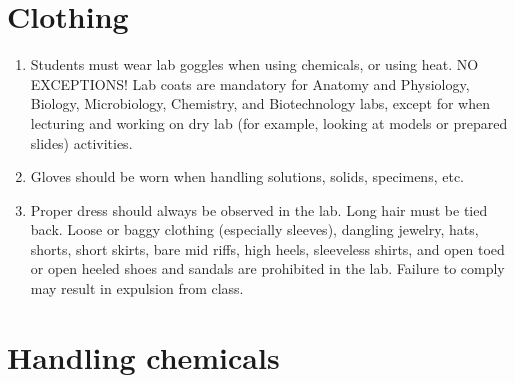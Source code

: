 \documentclass[]{book}
\providecommand{\tightlist}{%
  \setlength{\itemsep}{0pt}\setlength{\parskip}{0pt}}
\theoremstyle{definition}
\theoremstyle{definition}
\theoremstyle{definition}
\theoremstyle{remark}
\begin{document}
\section{Clothing}\label{clothing}

\begin{enumerate}
\def\labelenumi{\arabic{enumi}.}
\setcounter{enumi}{15}
\tightlist
\item
  Students must wear lab goggles when using chemicals, or using heat. NO
  EXCEPTIONS! Lab coats are mandatory for Anatomy and Physiology,
  Biology, Microbiology, Chemistry, and Biotechnology labs, except for
  when lecturing and working on dry lab (for example, looking at models
  or prepared slides) activities.
\item
  Gloves should be worn when handling solutions, solids, specimens, etc.
\item
  Proper dress should always be observed in the lab. Long hair must be
  tied back. Loose or baggy clothing (especially sleeves), dangling
  jewelry, hats, shorts, short skirts, bare mid riffs, high heels,
  sleeveless shirts, and open toed or open heeled shoes and sandals are
  prohibited in the lab. Failure to comply may result in expulsion from
  class.
\end{enumerate}

\section{Handling chemicals}\label{handling-chemicals}
\end{document}
